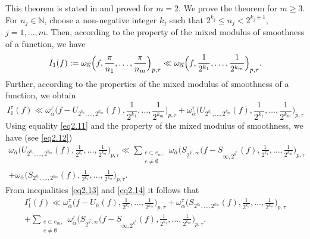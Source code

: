 \documentclass[12pt]{article}
\def\leq {\leqslant}
\theoremstyle{plain}
\begin{document}
\proof
This theorem is stated in \cite[Theorem 4.2]{2} and proved for $m=2$. We prove the theorem for $m\geqslant 3$.
For $n_{j}\in \mathbb{N}$, choose a non-negative integer $k_{j}$ such that
$2^{k_{j}}\leq n_{j}< 2^{k_{j} + 1}$, $j=1, \ldots , m$. Then, according to the property of the mixed modulus of smoothness of a function, we have
\begin{equation*}
   I_{1}(f):=\omega_{\overline\alpha}\Bigl(f,\frac{\pi}{n_{1}},\ldots, \frac{\pi}{n_{m}}\Bigr)_{p, \tau}  \ll \omega_{\overline\alpha}\Bigl(f,\frac{1}{2^{k_{1}}},\ldots , \frac{1}{2^{k_{m}}}\Bigr)_{p, \tau}.
 \end{equation*}
Further, according to the properties of the mixed modulus of smoothness of a function, we obtain
\begin{equation}\label{eq2.13}
I_{1}^{\tau}(f)\ll  \omega_{\overline\alpha}^{\tau}\bigl(f-U_{2^{k_{1}},...,2^{k_{m}}} (f), \frac{1}{2^{k_{1}}},\ldots , \frac{1}{2^{k_{m}}}\bigr)_{p, \tau} + \omega_{\overline\alpha}^{\tau}\bigl(U_{2^{k_{1}},...,2^{k_{m}}} (f), \frac{1}{2^{k_{1}}},\ldots , \frac{1}{2^{k_{m}}}\bigr)_{p, \tau}
\end{equation}
Using equality \eqref{eq2.11} and the property of the mixed modulus of smoothness, we have (see \eqref{eq2.12})
\begin{multline}\label{eq2.14}
\omega_{\overline\alpha}\bigl(U_{2^{k_{1}},...,2^{k_{m}}} (f), \frac{1}{2^{k_{1}}},\ldots , \frac{1}{2^{k_{m}}}\bigr)_{p, \tau} \ll \sum_{\substack{e\subset e_{m}, \\
e\neq \emptyset}} \omega_{\overline\alpha}\bigl(S_{2^{\overline{k}^{e}, \infty}}(f-S_{\infty, 2^{\overline{k}^{\hat{e}}}}(f), \frac{1}{2^{k_{1}}},\ldots , \frac{1}{2^{k_{m}}}\bigr)_{p, \tau}
\\
 + \omega_{\overline\alpha}\bigl(S_{2^{k_{1}},...,2^{k_{m}}}(f), \frac{1}{2^{k_{1}}},\ldots , \frac{1}{2^{k_{m}}}\bigr)_{p, \tau}.
\end{multline}
From inequalities \eqref{eq2.13} and \eqref{eq2.14} it follows that 
\begin{multline}\label{eq2.15}
I_{1}^{\tau}(f)\ll  \omega_{\overline\alpha}^{\tau}\bigl(f-U_{\overline{n}} (f), \frac{1}{2^{k_{1}}},\ldots , \frac{1}{2^{k_{m}}}\bigr)_{p, \tau} + \omega_{\overline\alpha}^{\tau}\bigl(S_{2^{k_{1}},...,2^{k_{m}}}(f), \frac{1}{2^{k_{1}}},\ldots , \frac{1}{2^{k_{m}}}\bigr)_{p, \tau} 
\\
+ \sum_{\substack{e\subset e_{m}, \\ e\neq \emptyset}}\omega_{\overline\alpha}^{\tau}\bigl(S_{2^{\overline{k}^{e}, \infty}}(f-S_{\infty, 2^{\overline{k}^{\hat{e}}}}(f), \frac{1}{2^{k_{1}}},\ldots , \frac{1}{2^{k_{m}}}\bigr)_{p, \tau}.
\end{multline}
\end{document}
